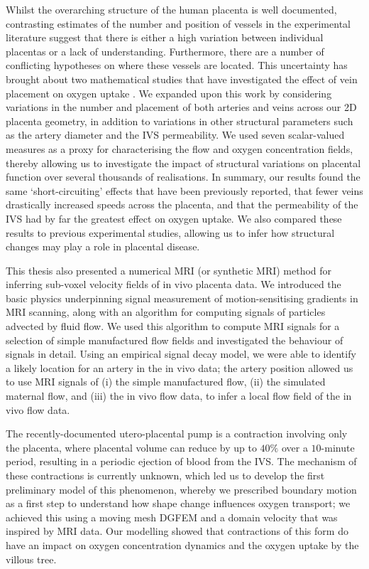         Whilst the overarching structure of the human placenta is well documented, contrasting estimates of the number and position of vessels in the experimental literature suggest that there is either a high variation between individual placentas or a lack of understanding. Furthermore, there are a number of conflicting hypotheses on where these vessels are located. This uncertainty has brought about two mathematical studies that have investigated the effect of vein placement on oxygen uptake \cite{chernyavskyMathematicalModelIntervillous2010,meklerImpactTissuePorosity2022}. We expanded upon this work by considering variations in the number and placement of both arteries and veins across our 2D placenta geometry, in addition to variations in other structural parameters such as the artery diameter and the IVS permeability. We used seven scalar-valued measures as a proxy for characterising the flow and oxygen concentration fields, thereby allowing us to investigate the impact of structural variations on placental function over several thousands of realisations. In summary, our results found the same `short-circuiting' effects that have been previously reported, that fewer veins drastically increased speeds across the placenta, and that the permeability of the IVS had by far the greatest effect on oxygen uptake. We also compared these results to previous experimental studies, allowing us to infer how structural changes may play a role in placental disease.

        This thesis also presented a numerical MRI (or synthetic MRI) method for inferring sub-voxel velocity fields of in vivo placenta data. We introduced the basic physics underpinning signal measurement of motion-sensitising gradients in MRI scanning, along with an algorithm for computing signals of particles advected by fluid flow. We used this algorithm to compute MRI signals for a selection of simple manufactured flow fields and investigated the behaviour of signals in detail. Using an empirical signal decay model, we were able to identify a likely location for an artery in the in vivo data; the artery position allowed us to use MRI signals of (i) the simple manufactured flow, (ii) the simulated maternal flow, and (iii) the in vivo flow data, to infer a local flow field of the in vivo flow data.

        The recently-documented utero-placental pump is a contraction involving only the placenta, where placental volume can reduce by up to $40\%$ over a $10$-minute period, resulting in a periodic ejection of blood from the IVS. The mechanism of these contractions is currently unknown, which led us to develop the first preliminary model of this phenomenon, whereby we prescribed boundary motion as a first step to understand how shape change influences oxygen transport; we achieved this using a moving mesh DGFEM and a domain velocity that was inspired by MRI data. Our modelling showed that contractions of this form do have an impact on oxygen concentration dynamics and the oxygen uptake by the villous tree.

